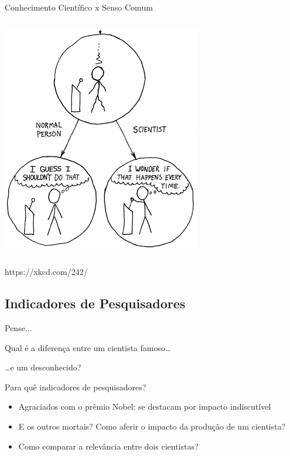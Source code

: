 \documentclass{beamer}
\begin{document}
\begin{frame}{Conhecimento Científico x Senso Comum}
\begin{columns}
\begin{column}{5cm}
\begin{center}
\begin{center}
          \includegraphics[width=\textwidth]{Intro/the_difference2}
        \end{center}
      \end{center}
    \end{column}
  \end{columns}

https://xkcd.com/242/
\end{frame}

\subsection{Indicadores de Pesquisadores}

\begin{frame}{Pense...}
  \begin{center}
    Qual é a diferença entre um cientista famoso\ldots

    \bigskip
    \ldots e um desconhecido?
  \end{center}
\end{frame}

\begin{frame}{Para quê indicadores de pesquisadores?}
  \begin{itemize}
  \item Agraciados com o prêmio Nobel: se destacam por impacto indiscutível
  \item E os outros mortais? Como aferir o impacto da produção de um cientista?
  \item Como comparar a relevância entre dois cientistas?
  \end{itemize}
\end{frame}
\end{document}
